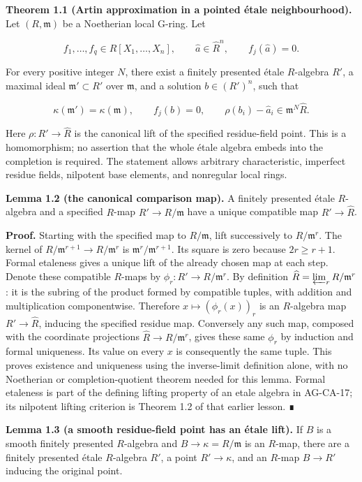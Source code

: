 \documentclass[11pt,a4paper,openany]{report}
\begin{document}
\textbf{Theorem 1.1 (Artin approximation in a pointed étale neighbourhood).} Let \((R,\mathfrak m)\) be a Noetherian local G-ring. Let

\[
f_1,\ldots,f_q\in R[X_1,\ldots,X_n],
\qquad \widehat a\in\widehat R^n,
\qquad f_j(\widehat a)=0.
\]

For every positive integer \(N\), there exist a finitely presented étale \(R\)-algebra \(R'\), a maximal ideal \(\mathfrak m'\subset R'\) over \(\mathfrak m\), and a solution \(b\in(R')^n\), such that

\[
\kappa(\mathfrak m')=\kappa(\mathfrak m),\qquad
f_j(b)=0,\qquad
\rho(b_i)-\widehat a_i\in\mathfrak m^N\widehat R.
\tag{1.1}
\]

Here \(\rho:R'\to\widehat R\) is the canonical lift of the specified residue-field point. This is a homomorphism; no assertion that the whole étale algebra embeds into the completion is required. The statement allows arbitrary characteristic, imperfect residue fields, nilpotent base elements, and nonregular local rings.

\textbf{Lemma 1.2 (the canonical comparison map).} A finitely presented étale \(R\)-algebra and a specified \(R\)-map \(R'\to R/\mathfrak m\) have a unique compatible map \(R'\to\widehat R\).

\textbf{Proof.} Starting with the specified map to \(R/\mathfrak m\), lift successively to \(R/\mathfrak m^r\). The kernel of \(R/\mathfrak m^{r+1}\to R/\mathfrak m^r\) is \(\mathfrak m^r/\mathfrak m^{r+1}\). Its square is zero because \(2r\geq r+1\). Formal etaleness gives a unique lift of the already chosen map at each step. Denote these compatible \(R\)-maps by \(\phi_r:R'\to R/\mathfrak m^r\). By definition \(\widehat R=\varprojlim_r R/\mathfrak m^r\): it is the subring of the product formed by compatible tuples, with addition and multiplication componentwise. Therefore \(x\mapsto(\phi_r(x))_r\) is an \(R\)-algebra map \(R'\to\widehat R\), inducing the specified residue map. Conversely any such map, composed with the coordinate projections \(\widehat R\to R/\mathfrak m^r\), gives these same \(\phi_r\) by induction and formal uniqueness. Its value on every \(x\) is consequently the same tuple. This proves existence and uniqueness using the inverse-limit definition alone, with no Noetherian or completion-quotient theorem needed for this lemma. Formal etaleness is part of the defining lifting property of an etale algebra in AG-CA-17; its nilpotent lifting criterion is Theorem 1.2 of that earlier lesson. ∎

\textbf{Lemma 1.3 (a smooth residue-field point has an étale lift).} If \(B\) is a smooth finitely presented \(R\)-algebra and \(B\to\kappa=R/\mathfrak m\) is an \(R\)-map, there are a finitely presented étale \(R\)-algebra \(R'\), a point \(R'\to\kappa\), and an \(R\)-map \(B\to R'\) inducing the original point.
\end{document}
